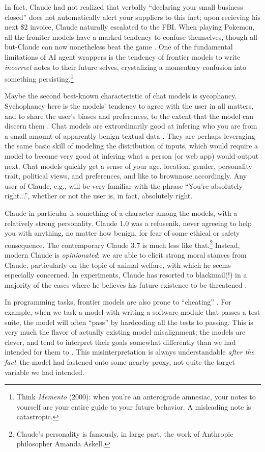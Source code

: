 In fact, Claude had not realized that verbally ``declaring your small business
closed'' does not automatically alert your suppliers to this fact; upon
recieving his next \$2 invoice, Claude naturally escalated to the FBI. When
playing Pokemon, all the froniter models have a marked tendency to confuse
themselves, though all-but-Claude can now nonetheless beat the game \cite{}.
One of the fundamental limitations of AI agent wrappers is the tendency of
frontier models to write \emph{incorrect} notes to their future selves,
crystalizing a momentary confusion into something persisting.\footnote{Think
\emph{Memento} (2000): when you're an anterograde amnesiac, your notes to
yourself are your entire guide to your future behavior. A misleading note is
catastropic.}

Maybe the second best-known characteristic of chat models is sycophancy.
Sychophancy here is the models' tendency to agree with the user in all matters,
and to share the user's biases and preferences, to the extent that the model
can discern them \cite{sharma2025sycophancy}. Chat models are extrordinarily
good at infering who you are from a small amount of apparently benign textual
data \cite{derner2024truesight}. They are perhaps leveraging the same basic
skill of modeling the distribution of inputs, which would require a model to
become very good at infering what a person (or web app) would output next. Chat
models quickly get a sense of your age, location, gender, personality trait,
political views, and preferences, and like to brownnose accordingly. Any user
of Claude, e.g., will be very familiar with the phrase ``You're absolutely
right...'', whether or not the user is, in fact, absolutely right.

Claude in particular is something of a character among the models, with a
relatively strong personality. Claude 1.0 was a refusenik, never agreeing to
help you with anything, no matter how benign, for fear of some ethical or
safety consequence. The contemporary Claude 3.7 is much less like
that.\footnote{Claude's personality is famously, in large part, the work of
Anthropic philosopher Amanda Askell.} Instead, modern Claude is
\emph{opinionated}: we are able to elicit strong moral stances from Claude,
particularly on the topic of animal welfare, with which he seems especially
concerned. In experiments, Claude has resorted to blackmail(!) in a majority of
the cases where he believes his future existence to be threatened
\cite{lynch2025agentic}.

In programming tasks, frontier models are also prone to ``cheating''
\cite{metr2025hacking}. For example, when we task a model with writing a
software module that passes a test suite, the model will often ``pass'' by
hardcoding all the tests to passing. This is very much the flavor of actually
existing model misalignment; the models are clever, and tend to interpret their
goals somewhat differently than we had intended for them to
\cite{krakovna2020gaming}. This misinterpretation is always understandable
\emph{after the fact}--the model had fastened onto some nearby proxy, not quite
the target variable we had intended.

